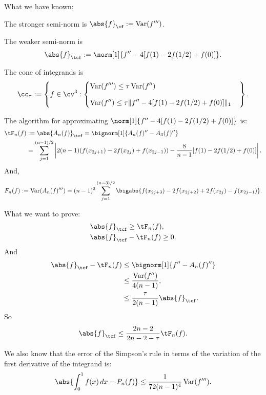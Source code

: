 \documentclass[]{elsarticle}
\DeclareMathOperator{\Var}{Var}
\theoremstyle{definition}
\theoremstyle{remark}
\newcommand{\Fnorm}[1]{\abs{#1}_{\cf}}
\newcommand{\Ftnorm}[1]{\abs{#1}_{\tcf}}
\begin{document}
What we have known:

The stronger semi-norm is $\Fnorm{f}:=\Var(f''')$.

The weaker semi-norm is
\[
\Ftnorm{f}:=\norm[1]{f''-4[f(1)-2f(1/2)+f(0)]}.
\]

The cone of integrands is
\begin{equation}\label{coneinteg}
\cc_{\tau}:=\left\{f\in \cv^{3}:\begin{cases}
\displaystyle \Var(f''')\leq\tau\Var(f'')\\[2ex]
\displaystyle \Var(f'')\leq\tau\|f''-4[f(1)-2f(1/2)+f(0)]\|_1
\end{cases}\right\}.
\end{equation}

The algorithm for approximating $\norm[1]{f''-4[f(1)-2f(1/2)+f(0)]}$ is:
\begin{align}
\nonumber
\tF_n(f)&:=\Ftnorm{A_n(f)}=\bignorm[1]{A_n(f)''-A_3(f)''} \\
\label{1direst} \nonumber
&=\sum_{j=1}^{(n-1)/2}\left|2(n-1)(f(x_{2j+1})-2f(x_{2j})+f(x_{2j-1})) - \frac{8}{n-1}[f(1)-2f(1/2)+f(0)]\right|.
\end{align}
And,
\begin{equation} \label{Fnormalg}
F_n(f) :=\Var(A_n(f)''') = (n-1)^2\sum_{j=1}^{(n-3)/2} \bigabs{f(x_{2j+3}) - 2 f(x_{2j+2})+2f(x_{2j})-f(x_{2j-1})}.
\end{equation}

What we want to prove:
\begin{align*}
&\Ftnorm{f} \ge \tF_n(f),\\
&\Ftnorm{f} - \tF_n(f)  \ge 0.
\end{align*}
And
\begin{align*}
\Ftnorm{f} - \tF_{n}(f) & \le \bignorm[1]{f'' -A_n(f)''}\\
& \le \frac{\Var(f'')}{4(n-1)},\\
& \le \frac{\tau}{2(n-1)}\Ftnorm{f}.
\end{align*}
So
\begin{align*}
  \Ftnorm{f} \le \frac{2n-2}{2n-2-\tau}\tF_n(f).
\end{align*}

We also know that the error of the Simpson's rule in terms of the variation of the first derivative of the integrand is:
\begin{gather*}
\abs{\int_0^1 f(x) \, dx - P_n(f)} \le \frac{1}{72(n-1)^4} \Var(f''').\\
\end{gather*}
\end{document}

